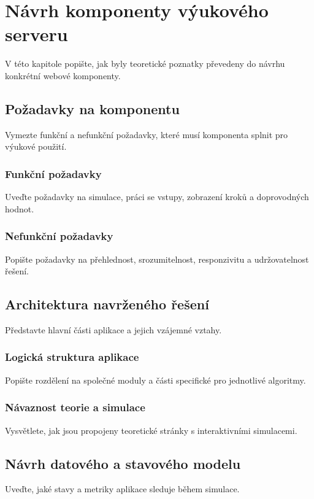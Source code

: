 \chapter{Návrh komponenty výukového serveru}

V této kapitole popište, jak byly teoretické poznatky převedeny do návrhu konkrétní webové komponenty.

\section{Požadavky na komponentu}
Vymezte funkční a nefunkční požadavky, které musí komponenta splnit pro výukové použití.

\subsection{Funkční požadavky}
Uveďte požadavky na simulace, práci se vstupy, zobrazení kroků a doprovodných hodnot.

\subsection{Nefunkční požadavky}
Popište požadavky na přehlednost, srozumitelnost, responzivitu a udržovatelnost řešení.

\section{Architektura navrženého řešení}
Představte hlavní části aplikace a jejich vzájemné vztahy.

\subsection{Logická struktura aplikace}
Popište rozdělení na společné moduly a části specifické pro jednotlivé algoritmy.

\subsection{Návaznost teorie a simulace}
Vysvětlete, jak jsou propojeny teoretické stránky s interaktivními simulacemi.

\section{Návrh datového a stavového modelu}
Uveďte, jaké stavy a metriky aplikace sleduje během simulace.

